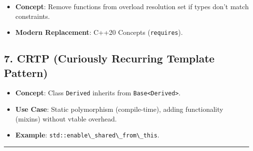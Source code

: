 \begin{itemize}
\tightlist
\item
  \textbf{Concept}: Remove functions from overload resolution set if
  types don't match constraints.
\item
  \textbf{Modern Replacement}: C++20 Concepts
  (\passthrough{\lstinline!requires!}).
\end{itemize}

\hypertarget{crtp-curiously-recurring-template-pattern}{%
\subsection{7. CRTP (Curiously Recurring Template
Pattern)}\label{crtp-curiously-recurring-template-pattern}}

\begin{itemize}
\tightlist
\item
  \textbf{Concept}: Class \passthrough{\lstinline!Derived!} inherits
  from \passthrough{\lstinline!Base<Derived>!}.
\item
  \textbf{Use Case}: Static polymorphism (compile-time), adding
  functionality (mixins) without vtable overhead.
\item
  \textbf{Example}:
  \passthrough{\lstinline!std::enable\_shared\_from\_this!}.
\end{itemize}

\begin{center}\rule{0.5\linewidth}{0.5pt}\end{center}
